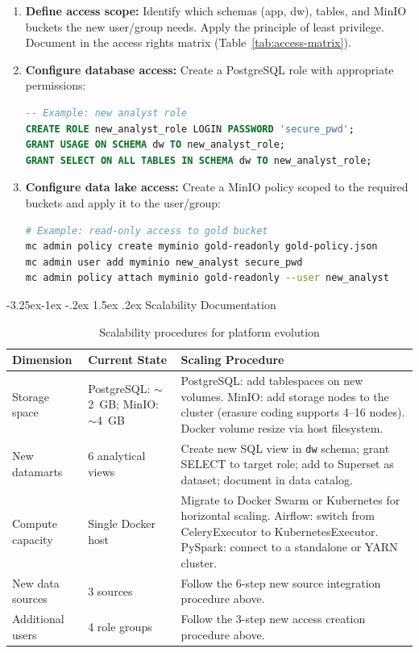 \documentclass[a4paper,11pt,oneside,openany]{report}
\makeatletter
\renewcommand\subsection{\@startsection{subsection}{2}{\z@}%
  {-3.25ex\@plus -1ex \@minus -.2ex}%
  {1.5ex \@plus .2ex}%
  {\normalfont\large\bfseries\color{ntdarkgreen}}}
\makeatother
\begin{document}
\begin{enumerate}[nosep]
  \item \textbf{Define access scope:} Identify which schemas (app, dw),
        tables, and MinIO buckets the new user/group needs. Apply the
        principle of least privilege. Document in the access rights matrix
        (Table~\ref{tab:access-matrix}).
  \item \textbf{Configure database access:} Create a PostgreSQL role with
        appropriate permissions:
        \begin{lstlisting}[language=SQL, numbers=none, frame=none, xleftmargin=0em, framexleftmargin=0em]
-- Example: new analyst role
CREATE ROLE new_analyst_role LOGIN PASSWORD 'secure_pwd';
GRANT USAGE ON SCHEMA dw TO new_analyst_role;
GRANT SELECT ON ALL TABLES IN SCHEMA dw TO new_analyst_role;
        \end{lstlisting}
  \item \textbf{Configure data lake access:} Create a MinIO policy scoped
        to the required buckets and apply it to the user/group:
        \begin{lstlisting}[language=bash, numbers=none, frame=none, xleftmargin=0em, framexleftmargin=0em]
# Example: read-only access to gold bucket
mc admin policy create myminio gold-readonly gold-policy.json
mc admin user add myminio new_analyst secure_pwd
mc admin policy attach myminio gold-readonly --user new_analyst
        \end{lstlisting}
\end{enumerate}

\subsection{Scalability Documentation}

\begin{table}[H]
\centering
\caption{Scalability procedures for platform evolution}
\label{tab:scalability}
\begin{tabularx}{\textwidth}{L{3cm} L{3cm} L{6.5cm}}
\toprule
\textbf{Dimension} & \textbf{Current State} & \textbf{Scaling Procedure} \\
\midrule
Storage space & PostgreSQL: $\sim$2~GB; MinIO: $\sim$4~GB & PostgreSQL: add tablespaces on new volumes. MinIO: add storage nodes to the cluster (erasure coding supports 4--16 nodes). Docker volume resize via host filesystem. \\
New datamarts & 6 analytical views & Create new SQL view in \texttt{dw} schema; grant SELECT to target role; add to Superset as dataset; document in data catalog. \\
Compute capacity & Single Docker host & Migrate to Docker Swarm or Kubernetes for horizontal scaling. Airflow: switch from CeleryExecutor to KubernetesExecutor. PySpark: connect to a standalone or YARN cluster. \\
New data sources & 3 sources & Follow the 6-step new source integration procedure above. \\
Additional users & 4 role groups & Follow the 3-step new access creation procedure above. \\
\bottomrule
\end{tabularx}
\end{table}
\end{document}
